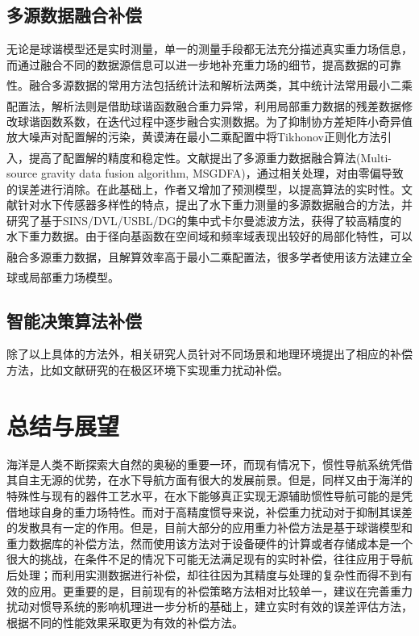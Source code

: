 \documentclass[12pt,a4,utf8]{article}
\newcommand{\upcite}[1]{\textsuperscript{\textsuperscript{\cite{#1}}}} %
\begin{document}
\subsection{多源数据融合补偿}
无论是球谐模型还是实时测量，单一的测量手段都无法充分描述真实重力场信息，而通过融合不同的数据源信息可以进一步地补充重力场的细节，提高数据的可靠性\upcite{DKXB20050100F}。融合多源数据的常用方法包括统计法和解析法两类\upcite{1020160654.nh}，其中统计法常用最小二乘配置法，解析法则是借助球谐函数融合重力异常\upcite{kern2003analysis,2009059209.nh}，利用局部重力数据的残差数据修改球谐函数系数，在迭代过程中逐步融合实测数据。为了抑制协方差矩阵小奇异值放大噪声对配置解的污染，黄谟涛在最小二乘配置中将Tikhonov正则化方法引入\upcite{HYCH201303004}，提高了配置解的精度和稳定性。文献\cite{LUOKAIXIN2023}提出了多源重力数据融合算法(Multi-source gravity data fusion algorithm, MSGDFA)，通过相关处理，对由零偏导致的误差进行消除。在此基础上，作者又增加了预测模型，以提高算法的实时性。文献\cite{1022810006.nh}针对水下传感器多样性的特点，提出了水下重力测量的多源数据融合的方法，并研究了基于SINS/DVL/USBL/DG的集中式卡尔曼滤波方法，获得了较高精度的水下重力数据。由于径向基函数在空间域和频率域表现出较好的局部化特性，可以融合多源重力数据，且解算效率高于最小二乘配置法\upcite{wittwer2009regional}，很多学者使用该方法建立全球或局部重力场模型\upcite{bentel2013different,bentel2016combining,pham2009solutions,klees2008data,CHXB201609003,DQWX201704009,mahbuby2017local,tenzer2008choice}。
\subsection{智能决策算法补偿}

除了以上具体的方法外，相关研究人员针对不同场景和地理环境提出了相应的补偿方法，比如文献\cite{LIQIAN2022}研究的在极区环境下实现重力扰动补偿。
\section{总结与展望}
海洋是人类不断探索大自然的奥秘的重要一环，而现有情况下，惯性导航系统凭借其自主无源的优势，在水下导航方面有很大的发展前景。但是，同样又由于海洋的特殊性与现有的器件工艺水平，在水下能够真正实现无源辅助惯性导航可能的是凭借地球自身的重力场特性。而对于高精度惯导来说，补偿重力扰动对于抑制其误差的发散具有一定的作用。但是，目前大部分的应用重力补偿方法是基于球谐模型和重力数据库的补偿方法，然而使用该方法对于设备硬件的计算或者存储成本是一个很大的挑战，在条件不足的情况下可能无法满足现有的实时补偿，往往应用于导航后处理；而利用实测数据进行补偿，却往往因为其精度与处理的复杂性而得不到有效的应用。更重要的是，目前现有的补偿策略方法相对比较单一，建议在完善重力扰动对惯导系统的影响机理进一步分析的基础上，建立实时有效的误差评估方法，根据不同的性能效果采取更为有效的补偿方法。
\end{document}
